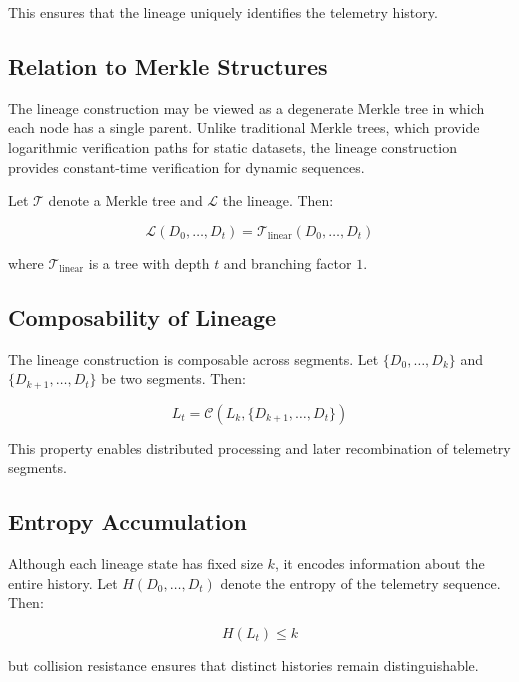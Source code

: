 This ensures that the lineage uniquely identifies the telemetry history.

\subsection{Relation to Merkle Structures}

The lineage construction may be viewed as a degenerate Merkle tree in which each node has a single parent. Unlike traditional Merkle trees, which provide logarithmic verification paths for static datasets, the lineage construction provides constant-time verification for dynamic sequences.

Let $\mathcal{T}$ denote a Merkle tree and $\mathcal{L}$ the lineage. Then:

\begin{equation}
\mathcal{L}(D_0, \dots, D_t) = \mathcal{T}_{\text{linear}}(D_0, \dots, D_t)
\end{equation}

where $\mathcal{T}_{\text{linear}}$ is a tree with depth $t$ and branching factor $1$.

\subsection{Composability of Lineage}

The lineage construction is composable across segments. Let $\{D_0, \dots, D_k\}$ and $\{D_{k+1}, \dots, D_t\}$ be two segments. Then:

\begin{equation}
L_t = \mathcal{C}(L_k, \{D_{k+1}, \dots, D_t\})
\end{equation}

This property enables distributed processing and later recombination of telemetry segments.

\subsection{Entropy Accumulation}

Although each lineage state has fixed size $k$, it encodes information about the entire history. Let $H(D_0, \dots, D_t)$ denote the entropy of the telemetry sequence. Then:

\begin{equation}
H(L_t) \leq k
\end{equation}

but collision resistance ensures that distinct histories remain distinguishable.

